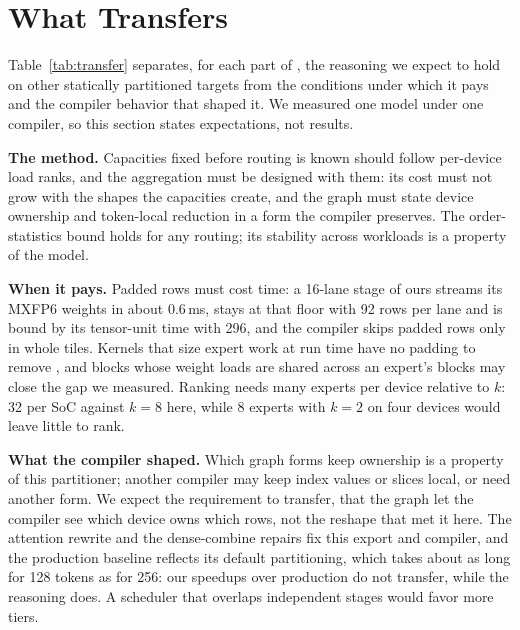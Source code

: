 \section{What Transfers}
\label{sec:transfer}

Table~\ref{tab:transfer} separates, for each part of \sys, the reasoning we expect to hold on other statically partitioned
targets from the conditions under which it pays and the compiler behavior that shaped it. We measured one model under one
compiler, so this section states expectations, not results.

\textbf{The method.} Capacities fixed before routing is known should follow per-device load ranks, and the aggregation
must be designed with them: its cost must not grow with the shapes the capacities create, and the graph must state device
ownership and token-local reduction in a form the compiler preserves. The order-statistics bound holds for any routing;
its stability across workloads is a property of the model.

\textbf{When it pays.} Padded rows must cost time: a 16-lane stage of ours streams its MXFP6 weights in about 0.6\,ms, stays
at that floor with 92 rows per lane and is bound by its tensor-unit time with 296, and the compiler skips padded rows only
in whole tiles. Kernels that size expert work at run time have no padding to remove \citep{gale2023megablocks}, and blocks
whose weight loads are shared across an expert's blocks \citep{awsneuronmoe} may close the gap we measured. Ranking needs
many experts per device relative to $k$: 32 per SoC against $k=8$ here, while 8 experts with $k=2$ on four devices would
leave little to rank.

\textbf{What the compiler shaped.} Which graph forms keep ownership is a property of this partitioner; another compiler may
keep index values or slices local, or need another form. We expect the requirement to transfer, that the graph let the
compiler see which device owns which rows, not the reshape that met it here. The attention rewrite and the dense-combine
repairs fix this export and compiler, and the production baseline reflects its default partitioning, which takes about as
long for 128 tokens as for 256: our speedups over production do not transfer, while the reasoning does. A scheduler that
overlaps independent stages would favor more tiers.
